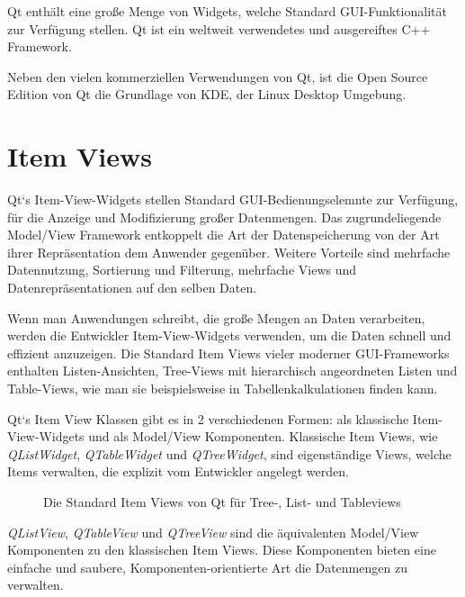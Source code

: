 \documentclass[11pt,a4paper,titlepage]{scrreprt}
\begin{document}
Qt enthält eine große Menge von Widgets, welche Standard GUI-Funktionalität zur
Verfügung stellen. Qt ist ein weltweit verwendetes und ausgereiftes C++ Framework.

Neben den vielen kommerziellen Verwendungen von Qt, ist die Open Source Edition
von Qt die Grundlage von KDE, der Linux Desktop Umgebung.

\section{Item Views}
Qt`s Item-View-Widgets stellen Standard GUI-Bedienungselemnte zur Verfügung, für die
Anzeige und Modifizierung großer Datenmengen. Das zugrundeliegende Model/View Framework
entkoppelt die Art der Datenspeicherung von der Art ihrer Repräsentation dem Anwender
gegenüber. Weitere Vorteile sind mehrfache Datennutzung, Sortierung und Filterung,
mehrfache Views und Datenrepräsentationen auf den selben Daten.

Wenn man Anwendungen schreibt, die große Mengen an Daten verarbeiten, werden die
Entwickler Item-View-Widgets verwenden, um die Daten schnell und effizient anzuzeigen.
Die Standard Item Views vieler moderner GUI-Frameworks enthalten Listen-Ansichten,
Tree-Views mit hierarchisch angeordneten Listen und Table-Views, wie man sie 
beispielsweise in Tabellenkalkulationen finden kann.

Qt`s Item View Klassen gibt es in 2 verschiedenen Formen: als klassische Item-View-Widgets
und als Model/View Komponenten. Klassische Item Views, wie {\itshape QListWidget}, 
{\itshape QTableWidget} und {\itshape QTreeWidget}, sind eigenständige Views, welche Items
verwalten, die explizit vom Entwickler angelegt werden.

\enlargethispage{1cm}
\begin{figure}[h]
\caption{Die Standard Item Views von Qt für Tree-, List- und Tableviews}
\end{figure}

{\itshape QListView}, {\itshape QTableView} und {\itshape QTreeView} sind die äquivalenten
Model/View Komponenten zu den klassischen Item Views. Diese Komponenten bieten eine
einfache und saubere, Komponenten-orientierte Art die Datenmengen zu verwalten.
\end{document}
